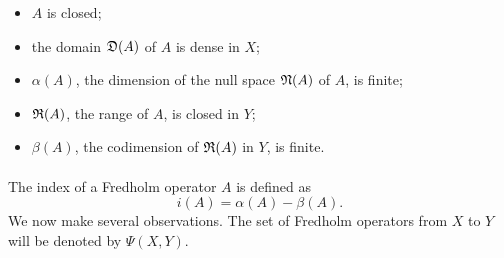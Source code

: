 \documentclass[11pt,twoside]{article}
\begin{document}
\begin{itemize}
\item[1.] $A$ is closed;
\item[2.] the domain $\mathfrak{D}(A)$ of $A$ is dense in $X$;
\item[3.] $\alpha(A)$, the dimension of the null space $\mathfrak{N}(A)$ of $A$,
          is finite;
\item[4.] $\mathfrak{R}(A)$, the range of $A$, is closed in $Y$;
\item[5.] $\beta(A)$, the codimension of $\mathfrak{R}(A)$ in $Y$, is finite.
\end{itemize}

\paragraph*{}
The index of a Fredholm operator $A$ is defined as
\[
i(A) = \alpha(A) - \beta(A).
\]
We now make several observations.
The set of Fredholm operators from $X$ to $Y$ will be denoted by $\Psi(X,Y)$.
\end{document}
